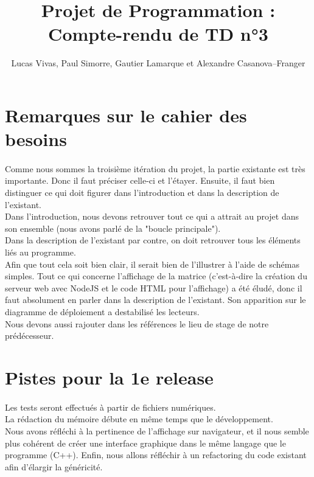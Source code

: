 \documentclass[a4paper]{article}
\title{Projet de Programmation : Compte-rendu de TD n°3}
\author{Lucas Vivas, Paul Simorre, Gautier Lamarque et Alexandre Casanova--Franger}
\begin{document}
\maketitle

\section*{Remarques sur le cahier des besoins}
\paragraph{}
Comme nous sommes la troisième itération du projet, la partie existante est très
importante. Donc il faut préciser celle-ci et l'étayer.
Ensuite, il faut bien distinguer ce qui doit figurer dans l'introduction et
dans la description de l'existant.\\
Dans l'introduction, nous devons retrouver tout ce qui a attrait au projet dans
son ensemble (nous avons parlé de la "boucle principale").\\
Dans la description de l'existant par contre, on doit retrouver tous les
éléments liés au programme.\\
Afin que tout cela soit bien clair, il serait bien de l'illustrer à l'aide de
schémas simples.
Tout ce qui concerne l'affichage de la matrice (c'est-à-dire la création du
serveur web avec NodeJS et le code HTML pour l'affichage) a été éludé, donc il
faut absolument en parler dans la description de l'existant. Son apparition sur
le diagramme de déploiement a destabilisé les lecteurs.\\
Nous devons aussi rajouter dans les références le lieu de stage de notre
prédécesseur.

\section*{Pistes pour la 1e release}
\paragraph{}
Les tests seront effectués à partir de fichiers numériques. \\
La rédaction du mémoire débute en même temps que le développement.\\
Nous avons réfléchi à la pertinence de l'affichage sur navigateur, et il nous
semble plus cohérent de créer une interface graphique dans le même langage
que le programme (C++).
Enfin, nous allons réfléchir à un refactoring du code existant afin d'élargir
la généricité.
\end{document}
